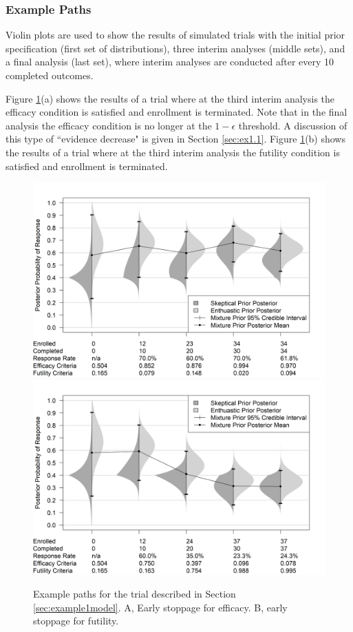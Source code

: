 \documentclass[useAMS,usenatbib,referee]{biom}
\begin{document}
\subsubsection{Example Paths}
Violin plots are used to show the results of simulated trials with the initial prior specification (first set of distributions), three interim analyses (middle sets), and a final analysis (last set), where interim analyses are conducted after every 10 completed outcomes. 

Figure \ref{fig:figure2}(a) shows the results of a trial where at the third interim analysis the efficacy condition is satisfied and enrollment is terminated. Note that in the final analysis the efficacy condition is no longer at the $1-\epsilon$ threshold. A discussion of this type of ``evidence decrease" is given in Section \ref{sec:ex1.1}.
%
Figure \ref{fig:figure2}(b) shows the results of a trial where at the third interim analysis the futility condition is satisfied and enrollment is terminated. 

\begin{figure}\begin{center}
    \includegraphics[width=6in]{../00-paper/FIGURES/figure2a.png}
    \includegraphics[width=6in]{../00-paper/FIGURES/figure2b.png}
    \caption{Example paths for the trial described in Section \ref{sec:example1model}. A, Early stoppage for efficacy. B, early stoppage for futility.}
	\label{fig:figure2}
\end{center}
\end{figure}
\end{document}
